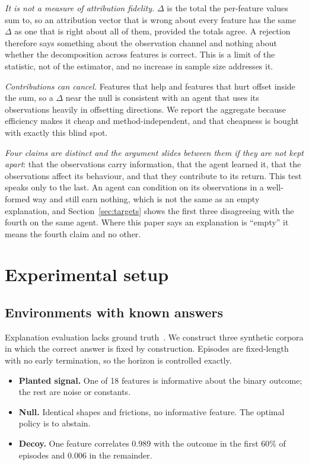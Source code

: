 \documentclass[10pt,twocolumn]{article}
\begin{document}
\emph{It is not a measure of attribution fidelity.} $\Delta$ is the total the
per-feature values sum to, so an attribution vector that is wrong about every
feature has the same $\Delta$ as one that is right about all of them, provided
the totals agree. A rejection therefore says something about the observation
channel and nothing about whether the decomposition across features is correct.
This is a limit of the statistic, not of the estimator, and no increase in
sample size addresses it.

\emph{Contributions can cancel.} Features that help and features that hurt
offset inside the sum, so a $\Delta$ near the null is consistent with an agent
that uses its observations heavily in offsetting directions. We report the
aggregate because efficiency makes it cheap and method-independent, and that
cheapness is bought with exactly this blind spot.

\emph{Four claims are distinct and the argument slides between them if they are
not kept apart}: that the observations carry information, that the agent learned
it, that the observations affect its behaviour, and that they contribute to its
return. This test speaks only to the last. An agent can condition on its
observations in a well-formed way and still earn nothing, which is not the same
as an empty explanation, and Section~\ref{sec:targets} shows the first three
disagreeing with the fourth on the same agent. Where this paper says an
explanation is ``empty'' it means the fourth claim and no other.

\section{Experimental setup}

\subsection{Environments with known answers}
\label{sec:synthetic}

Explanation evaluation lacks ground truth~\citep{cheng2025survey}. We construct
three synthetic corpora in which the correct answer is fixed by construction.
Episodes are fixed-length with no early termination, so the horizon is controlled
exactly.

\begin{itemize}[leftmargin=1.1em,itemsep=1pt,topsep=2pt]
\item \textbf{Planted signal.} One of 18 features is informative about the binary
outcome; the rest are noise or constants.
\item \textbf{Null.} Identical shapes and frictions, no informative feature. The
optimal policy is to abstain.
\item \textbf{Decoy.} One feature correlates $0.989$ with the outcome in the first
$60\%$ of episodes and $0.006$ in the remainder.
\end{itemize}
\end{document}
